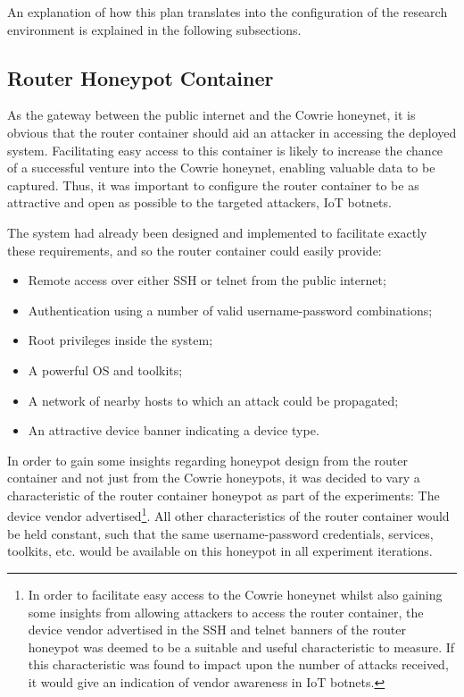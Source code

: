 An explanation of how this plan translates into the configuration of the research environment is explained in the following subsections.

\subsection{Router Honeypot Container}
As the gateway between the public internet and the Cowrie honeynet, it is obvious that the router container should aid an attacker in accessing the deployed system. Facilitating easy access to this container is likely to increase the chance of a successful venture into the Cowrie honeynet, enabling valuable data to be captured. Thus, it was important to configure the router container to be as attractive and open as possible to the targeted attackers, IoT botnets. 

The system had already been designed and implemented to facilitate exactly these requirements, and so the router container could easily provide:

\begin{itemize}
\item Remote access over either SSH or telnet from the public internet;
\item Authentication using a number of valid username-password combinations;
\item Root privileges inside the system;
\item A powerful OS and toolkits;
\item A network of nearby hosts to which an attack could be propagated;
\item An attractive device banner indicating a device type.
\end{itemize}

In order to gain some insights regarding honeypot design from the router container  and not just from the Cowrie honeypots, it was decided to vary a characteristic of the router container honeypot as part of the experiments: The device vendor advertised\footnote{In order to facilitate easy access to the Cowrie honeynet whilst also gaining some insights from allowing attackers to access the router container, the device vendor advertised in the SSH and telnet banners of the router honeypot was deemed to be a suitable and useful characteristic to measure. If this characteristic was found to impact upon the number of attacks received, it would give an indication of vendor awareness in IoT botnets.}. All other characteristics of the router container would be held constant, such that the same username-password credentials, services, toolkits, etc. would be available on this honeypot in all experiment iterations. 

